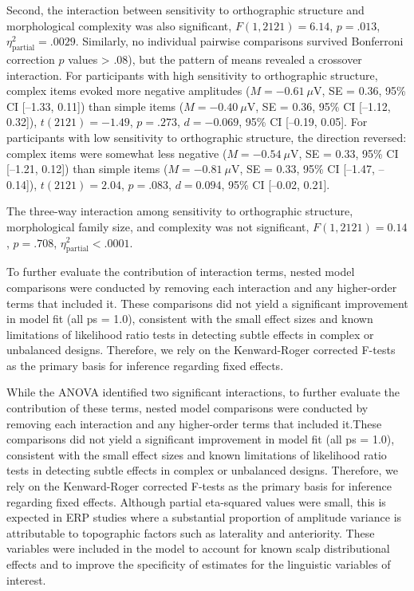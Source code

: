 \documentclass[preprint,12pt, authoryear, review]{elsarticle}
\begin{document}
Second, the interaction between sensitivity to orthographic structure and morphological complexity was also significant, $F(1, 2121) = 6.14$, $p = .013$, $\eta^2_{\text{partial}} = .0029$. Similarly, no individual pairwise comparisons survived Bonferroni correction $p$ values > $.08$), but the pattern of means revealed a crossover interaction. For participants with high sensitivity to orthographic structure, complex items evoked more negative amplitudes ($M = -0.61~\mu\text{V}$, SE = 0.36, 95\% CI [–1.33, 0.11]) than simple items ($M = -0.40~\mu\text{V}$, SE = 0.36, 95\% CI [–1.12, 0.32]), $t(2121) = -1.49$, $p = .273$, $d = -0.069$, 95\% CI [–0.19, 0.05]. For participants with low sensitivity to orthographic structure, the direction reversed: complex items were somewhat less negative ($M = -0.54~\mu\text{V}$, SE = 0.33, 95\% CI [–1.21, 0.12]) than simple items ($M = -0.81~\mu\text{V}$, SE = 0.33, 95\% CI [–1.47, –0.14]), $t(2121) = 2.04$, $p = .083$, $d = 0.094$, 95\% CI [–0.02, 0.21].

The three-way interaction among sensitivity to orthographic structure, morphological family size, and complexity was not significant, $F(1, 2121) = 0.14$, $p = .708$, $\eta^2_{\text{partial}} < .0001$.

To further evaluate the contribution of interaction terms, nested model comparisons were conducted by removing each interaction and any higher-order terms that included it. These comparisons did not yield a significant improvement in model fit (all ps = 1.0), consistent with the small effect sizes and known limitations of likelihood ratio tests in detecting subtle effects in complex or unbalanced designs. Therefore, we rely on the Kenward-Roger corrected F-tests as the primary basis for inference regarding fixed effects.

While the ANOVA identified two significant interactions, to further evaluate the contribution of these terms, nested model comparisons were conducted by removing each interaction and any higher-order terms that included it.These comparisons did not yield a significant improvement in model fit (all ps = 1.0), consistent with the small effect sizes and known limitations of likelihood ratio tests in detecting subtle effects in complex or unbalanced designs. Therefore, we rely on the Kenward-Roger corrected F-tests as the primary basis for inference regarding fixed effects.  Although partial eta-squared values were small, this is expected in ERP studies where a substantial proportion of amplitude variance is attributable to topographic factors such as laterality and anteriority. These variables were included in the model to account for known scalp distributional effects and to improve the specificity of estimates for the linguistic variables of interest.
\end{document}
